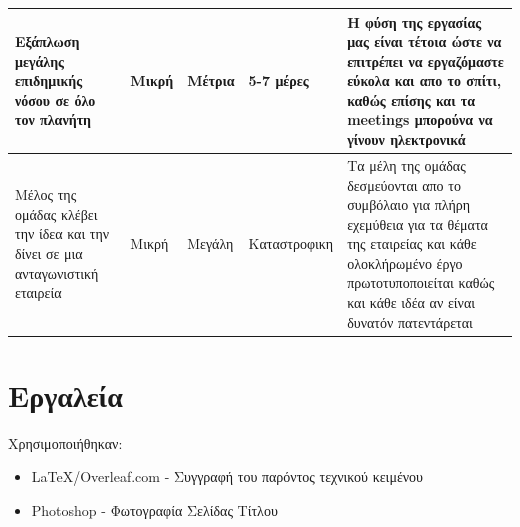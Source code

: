 \documentclass{article}
\begin{document}
\begin{table}[!htbp]
{\begin{tabularx}{0.9\paperwidth}{ |X|s|s|s|X| }
            \hline
            Εξάπλωση μεγάλης επιδημικής νόσου σε όλο τον πλανήτη & Μικρή & Μέτρια & 5-7 μέρες & Η φύση της εργασίας μας είναι τέτοια ώστε να επιτρέπει να εργαζόμαστε εύκολα και απο το σπίτι, καθώς επίσης και τα meetings μπορούνα να γίνουν ηλεκτρονικά\\
            \hline
            Mέλος της ομάδας κλέβει την ίδεα και την δίνει σε μια ανταγωνιστική εταιρεία & Μικρή & Μεγάλη & Καταστροφικη & Τα μέλη της ομάδας δεσμεύονται απο το συμβόλαιο για πλήρη εχεμύθεια για τα θέματα της εταιρείας και κάθε ολοκλήρωμένο έργο πρωτοτυποποιείται καθώς και κάθε ιδέα αν είναι δυνατόν πατεντάρεται  \\
            \hline
            
            
            
            
            \end{tabularx}
        }
    \end{table}

\section{Εργαλεία}
Χρησιμοποιήθηκαν:
\begin{itemize}

    \item \LaTeX/Overleaf.com - Συγγραφή του παρόντος τεχνικού κειμένου
    \item Photoshop - Φωτογραφία Σελίδας Τίτλου
    
\end{itemize}
\end{document}
